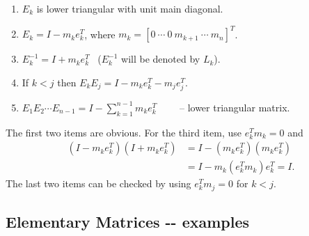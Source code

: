 \documentclass[11pt]{article}
\begin{document}
\begin{enumerate}
\def\labelenumi{\arabic{enumi}.}
\item
  \(E_k\) is lower triangular with unit main diagonal.
\item
  \(E_k=I-m_k e_k^T\), where
  \(m_k=[0\ \cdots\ 0\ m_{k+1}\ \cdots\ m_n]^T\).
\item
  \(E_k^{-1}=I + m_ke_k^T\) ~(\(E_k^{-1}\) will be denoted by \(L_k\)).
\item
  If \(k < j\) then \(E_k E_j=I-m_ke_k^T-m_je_j^T\).
\item
  \(E_1E_2\cdots E_{n-1}=I-\sum_{k=1}^{n-1}m_ke_k^T\qquad\) -- lower
  triangular matrix.
\end{enumerate}

The first two items are obvious. For the third item, use \(e_k^T m_k=0\)
and \[\begin{aligned}
\left(I-m_k e_k^T\right) \left(I+ m_k e_k^T\right)
&= I -\left(m_k e_k^T\right)\left( m_k e_k^T\right)\\
&= I -m_k \left(e_k^T m_k\right) e_k^T = I.\end{aligned}\] The last two
items can be checked by using \(e_k^T m_j=0\) for \(k< j\).

    \subsection{Elementary Matrices -\/-
examples}\label{elementary-matrices----examples}
\end{document}
